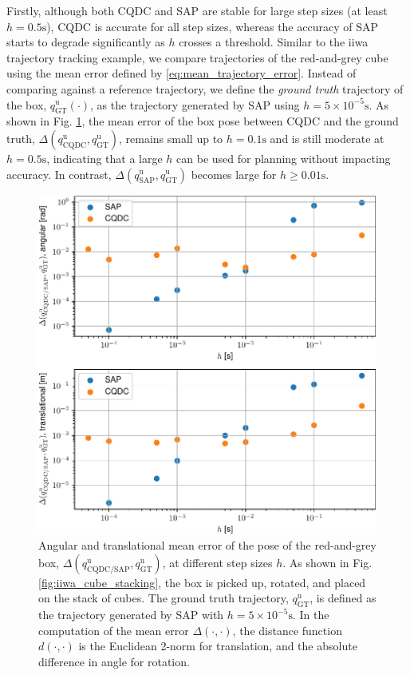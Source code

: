 Firstly, although both CQDC and SAP are stable for large step sizes (at least $h=0.5\mathrm{s}$), CQDC is accurate for all step sizes, whereas the accuracy of SAP starts to degrade significantly as $h$ crosses a threshold. 
Similar to the iiwa trajectory tracking example, we compare trajectories of the red-and-grey cube using the mean error defined by \eqref{eq:mean_trajectory_error}. Instead of comparing against a reference trajectory, we define the \emph{ground truth} trajectory of the box, $q_\mathrm{GT}^\mathrm{u}(\cdot)$, as the trajectory generated by SAP using $h=5 \times 10^{-5} \mathrm{s}$.
As shown in Fig. \ref{fig:error_vs_time_step}, the mean error of the box pose between CQDC and the ground truth, $\Delta (q_\mathrm{CQDC}^\mathrm{u}, q_\mathrm{GT}^\mathrm{u})$, remains small up to $h=0.1\mathrm{s}$ and is still moderate at $h=0.5\mathrm{s}$, indicating that a large $h$ can be used for planning without impacting accuracy.
In contrast, $\Delta (q_\mathrm{SAP}^\mathrm{u}, q_\mathrm{GT}^\mathrm{u})$ becomes large for $h \geq 0.01 \mathrm{s}$.
\begin{figure}
\centering
\includegraphics[width=0.8\linewidth]{figures/02_quasi_static_dynamics/error_vs_time_step.pdf}
\caption{Angular and translational mean error of the pose of the red-and-grey box, $\Delta (q_\mathrm{CQDC/SAP}^\mathrm{u}, q_\mathrm{GT}^\mathrm{u})$, at different step sizes $h$.
As shown in Fig. \ref{fig:iiwa_cube_stacking}, the box is picked up, rotated, and placed on the stack of cubes.
The ground truth trajectory, $q_\mathrm{GT}^\mathrm{u}$, is defined as the trajectory generated by SAP with $h=5\times10^{-5}\mathrm{s}$.
In the computation of the mean error $\Delta(\cdot, \cdot)$, the distance function $d(\cdot, \cdot)$ is the Euclidean 2-norm for translation, and the absolute difference in angle for rotation.
}
\label{fig:error_vs_time_step}
\end{figure}

